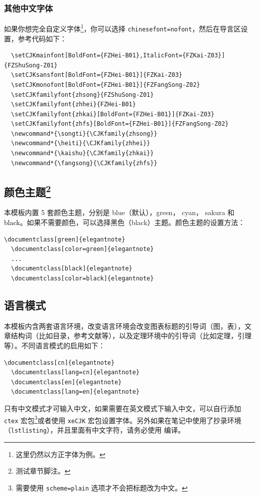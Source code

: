 \subsubsection{其他中文字体}
如果你想完全自定义字体\footnote{这里仍然以方正字体为例。}，你可以选择 \lstinline{chinesefont=nofont}，然后在导言区设置，参考代码如下：
\begin{lstlisting}
  \setCJKmainfont[BoldFont={FZHei-B01},ItalicFont={FZKai-Z03}]{FZShuSong-Z01}
  \setCJKsansfont[BoldFont={FZHei-B01}]{FZKai-Z03}
  \setCJKmonofont[BoldFont={FZHei-B01}]{FZFangSong-Z02}
  \setCJKfamilyfont{zhsong}{FZShuSong-Z01}
  \setCJKfamilyfont{zhhei}{FZHei-B01}
  \setCJKfamilyfont{zhkai}[BoldFont={FZHei-B01}]{FZKai-Z03}
  \setCJKfamilyfont{zhfs}[BoldFont={FZHei-B01}]{FZFangSong-Z02}
  \newcommand*{\songti}{\CJKfamily{zhsong}}
  \newcommand*{\heiti}{\CJKfamily{zhhei}}
  \newcommand*{\kaishu}{\CJKfamily{zhkai}}
  \newcommand*{\fangsong}{\CJKfamily{zhfs}}
\end{lstlisting}


\subsection[颜色主题]{颜色主题\footnote{测试章节脚注。}}

本模板内置 5 套颜色主题，分别是 \textcolor{eblue}{blue}（默认），\textcolor{egreen}{green}， \textcolor{ecyan}{cyan}， \textcolor{sakura}{sakura} 和 \textcolor{black}{black}。如果不需要颜色，可以选择黑色（black）主题。颜色主题的设置方法：
\begin{lstlisting}[frame=none]  
  \documentclass[green]{elegantnote}
  \documentclass[color=green]{elegantnote}
  ...
  \documentclass[black]{elegantnote}
  \documentclass[color=black]{elegantnote}
\end{lstlisting}


\subsection{语言模式}

本模板内含两套语言环境，改变语言环境会改变图表标题的引导词（图，表），文章结构词（比如目录，参考文献等），以及定理环境中的引导词（比如定理，引理等）。不同语言模式的启用如下：
\begin{lstlisting}[frame=none]  
  \documentclass[cn]{elegantnote} 
  \documentclass[lang=cn]{elegantnote} 
  \documentclass[en]{elegantnote} 
  \documentclass[lang=en]{elegantnote}
\end{lstlisting}

\begin{note}
只有中文模式才可输入中文，如果需要在英文模式下输入中文，可以自行添加 \lstinline{ctex} 宏包\footnote{需要使用 \lstinline{scheme=plain} 选项才不会把标题改为中文。}或者使用 \lstinline{xeCJK} 宏包设置字体。另外如果在笔记中使用了抄录环境（\lstinline{lstlisting}），并且里面有中文字符，请务必使用  编译。
\end{note}


